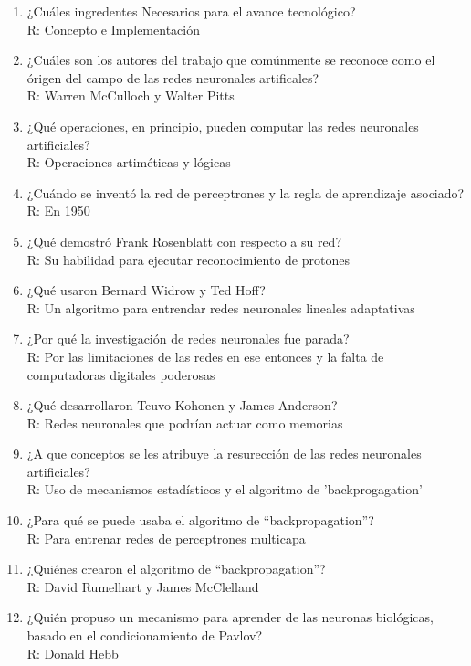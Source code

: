 \documentclass{article}
\author{Jorge Gómez Reus}
\date{}
\begin{document}
\maketitle
\begin{enumerate}
	\item ¿Cuáles ingredentes Necesarios para el avance tecnológico?\\
	R: Concepto e Implementación
	\item ¿Cuáles son los autores del trabajo que comúnmente se reconoce como el órigen del campo de las redes neuronales artificales?\\
	R: Warren McCulloch y Walter Pitts
	\item ¿Qué operaciones, en principio, pueden computar las redes neuronales artificiales?\\
	R: Operaciones artiméticas y lógicas
	\item ¿Cuándo se inventó la red de perceptrones y la regla de aprendizaje asociado?\\
	R: En 1950
	\item ¿Qué demostró Frank Rosenblatt con respecto a su red?\\
	R: Su habilidad para ejecutar reconocimiento de protones
	\item ¿Qué usaron Bernard Widrow y Ted Hoff?\\
	R: Un algoritmo para entrendar redes neuronales lineales adaptativas
	\item ¿Por qué la investigación de redes neuronales fue parada?\\
	R: Por las limitaciones de las redes en ese entonces y la falta de computadoras digitales poderosas
	\item ¿Qué desarrollaron Teuvo Kohonen y James Anderson?\\
	R: Redes neuronales que podrían actuar como memorias
	\item ¿A que conceptos se les atribuye la resurección de las redes neuronales artificiales?\\
	R: Uso de mecanismos estadísticos y el algoritmo de 'backprogagation'
	\item ¿Para qué se puede usaba el algoritmo de ``backpropagation''?\\
	R: Para entrenar redes de perceptrones multicapa
	\item ¿Quiénes crearon el algoritmo de ``backpropagation''?\\
	R: David Rumelhart y James McClelland
	\item ¿Quién propuso un mecanismo para aprender de las neuronas biológicas, basado en el condicionamiento de Pavlov?\\
	R: Donald Hebb
	
	
\end{enumerate}
\end{document}
